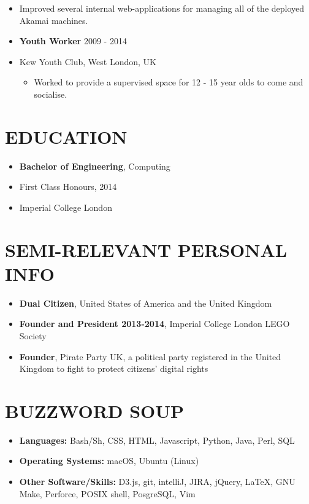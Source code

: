 \documentclass[line,margin]{res}
\newcommand\oindent{0em}
\newcommand\lindent{1.5em}
\newcommand\si{\item[]}
\newenvironment{secretlist}[1]{\begin{itemize}[noitemsep,leftmargin=#1,nolistsep]}{\end{itemize}}
\begin{document}
\begin{resume}
\begin{secretlist}{\oindent}
\begin{secretlist}{\lindent}
                    \si Improved several internal web-applications for managing all of the deployed Akamai machines.
                \end{secretlist}
            \end{secretlist}
            \vspace{0.6em}
            \begin{secretlist}{\oindent}
                \si \textbf{Youth Worker} \hfill 2009 - 2014
                \si Kew Youth Club, West London, UK
                \begin{secretlist}{\lindent}
                    \si Worked to provide a supervised space for 12 - 15 year olds to come and socialise.
                \end{secretlist}
            \end{secretlist}

        \section{EDUCATION}
            \begin{secretlist}{\oindent}
                \si \textbf{Bachelor of Engineering}, Computing
                \si First Class Honours, 2014
                \si Imperial College London
            \end{secretlist}

        \section{SEMI-RELEVANT PERSONAL INFO}
            \begin{secretlist}{\oindent}
                \si \textbf{Dual Citizen}, United States of America and the United Kingdom
                \si \textbf{Founder and President 2013-2014}, Imperial College London LEGO Society
                \si \textbf{Founder}, Pirate Party UK, a political party registered in the United Kingdom to fight to protect citizens' digital rights
            \end{secretlist}

        \section{BUZZWORD SOUP}
            \begin{secretlist}{\oindent}
                \si \textbf{Languages:} Bash/Sh, CSS, HTML, Javascript, Python, Java, Perl, SQL
                \si \textbf{Operating Systems:} macOS, Ubuntu (Linux)
                \si \textbf{Other Software/Skills:} D3.js, git, intelliJ, JIRA, jQuery, \LaTeX, GNU Make, Perforce, POSIX shell, PosgreSQL, Vim
            \end{secretlist}
    \end{resume}
\end{document}
